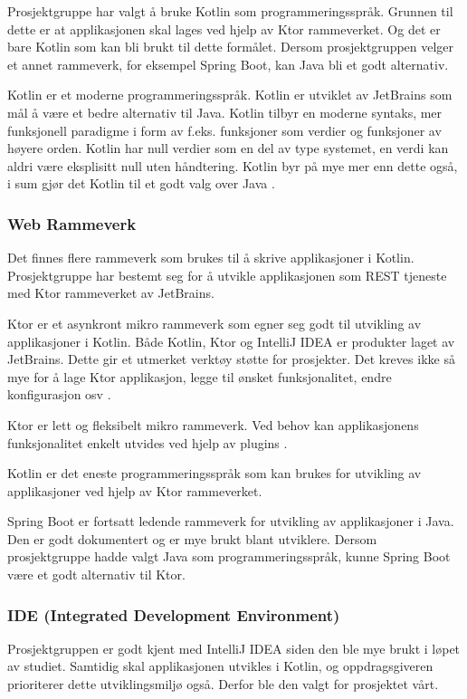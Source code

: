 Prosjektgruppe har valgt å bruke Kotlin som programmeringsspråk. Grunnen til dette er at applikasjonen skal lages ved hjelp av Ktor rammeverket. Og det er bare Kotlin som kan bli brukt til dette formålet. Dersom prosjektgruppen velger et annet rammeverk, for eksempel Spring Boot, kan Java bli et godt alternativ.

Kotlin er et moderne programmeringsspråk. Kotlin er utviklet av JetBrains som mål å være et bedre alternativ til Java. Kotlin tilbyr en moderne syntaks, mer funksjonell paradigme i form av f.eks. funksjoner som verdier og funksjoner av høyere orden. Kotlin har null verdier som en del av type systemet, en verdi kan aldri være eksplisitt null uten håndtering. Kotlin byr på mye mer enn dette også, i sum gjør det Kotlin til et godt valg over Java \cite{4-imaginarycloud.com}.

\subsubsection*{Web Rammeverk}

Det finnes flere rammeverk som brukes til å skrive applikasjoner i Kotlin. Prosjektgruppe har bestemt seg for å utvikle applikasjonen som REST tjeneste med Ktor rammeverket av JetBrains.

Ktor er et asynkront mikro rammeverk som egner seg godt til utvikling av applikasjoner i Kotlin. Både Kotlin, Ktor og IntelliJ IDEA er produkter laget av JetBrains. Dette gir et utmerket verktøy støtte for prosjekter. Det kreves ikke så mye for å lage Ktor applikasjon, legge til ønsket funksjonalitet, endre konfigurasjon osv \cite{4-ktor.io-idea}.

Ktor er lett og fleksibelt mikro rammeverk. Ved behov kan applikasjonens funksjonalitet enkelt utvides ved hjelp av plugins \cite{4-ktor.io}.

Kotlin er det eneste programmeringsspråk som kan brukes for utvikling av applikasjoner ved hjelp av Ktor rammeverket.

Spring Boot er fortsatt ledende rammeverk for utvikling av applikasjoner i Java. Den er godt dokumentert og er mye brukt blant utviklere. Dersom prosjektgruppe hadde valgt Java som programmeringsspråk, kunne Spring Boot være et godt alternativ til Ktor.
\subsubsection*{IDE (Integrated Development Environment)}

Prosjektgruppen er godt kjent med IntelliJ IDEA siden den ble mye brukt i løpet av studiet. Samtidig skal applikasjonen utvikles i Kotlin, og oppdragsgiveren prioriterer dette utviklingsmiljø også. Derfor ble den valgt for prosjektet vårt.  

